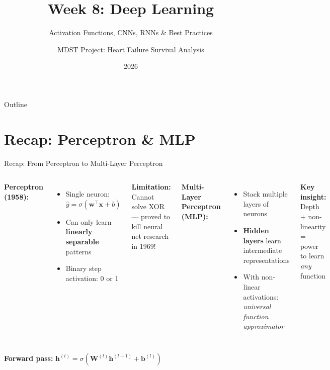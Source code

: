 \documentclass[aspectratio=169]{beamer}
\title{Week 8: Deep Learning}
\subtitle{Activation Functions, CNNs, RNNs \& Best Practices}
\author{MDST Project: Heart Failure Survival Analysis}
\date{2026}
\begin{document}
\frame{\titlepage}

\begin{frame}{Outline}
\tableofcontents
\end{frame}

\section{Recap: Perceptron \& MLP}

\begin{frame}{Recap: From Perceptron to Multi-Layer Perceptron}

\begin{columns}
\textbf{Perceptron (1958):}
\begin{itemize}
    \item Single neuron: $\hat{y} = \sigma(\mathbf{w}^\top \mathbf{x} + b)$
    \item Can only learn \textbf{linearly separable} patterns
    \item Binary step activation: 0 or 1
\end{itemize}

\vspace{0.3cm}
\textbf{Limitation:} Cannot solve XOR --- proved to kill neural net research in 1969!

\textbf{Multi-Layer Perceptron (MLP):}
\begin{itemize}
    \item Stack multiple layers of neurons
    \item \textbf{Hidden layers} learn intermediate representations
    \item With non-linear activations: \emph{universal function approximator}
\end{itemize}

\vspace{0.3cm}
\textbf{Key insight:} Depth + non-linearity = power to learn \emph{any} function
\end{columns}

\vspace{0.3cm}
\centering
\textbf{Forward pass:} $\mathbf{h}^{(l)} = \sigma\!\left(\mathbf{W}^{(l)}\mathbf{h}^{(l-1)} + \mathbf{b}^{(l)}\right)$
\end{frame}
\end{document}

